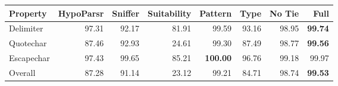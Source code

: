 \begin{tabular}{lrrr|rrrr}
Property & HypoParsr & Sniffer & Suitability & Pattern & Type & No Tie & Full\\
\hline
Delimiter & 97.31 & 92.17 & 81.91 & 99.59 & 93.16 & 98.95 & \textbf{99.74}\\
Quotechar & 87.46 & 92.93 & 24.61 & 99.30 & 87.49 & 98.77 & \textbf{99.56}\\
Escapechar & 97.43 & 99.65 & 85.21 & \textbf{100.00} & 96.76 & 99.18 & 99.97\\
Overall & 87.28 & 91.14 & 23.12 & 99.21 & 84.71 & 98.74 & \textbf{99.53}\\
\hline
\end{tabular}